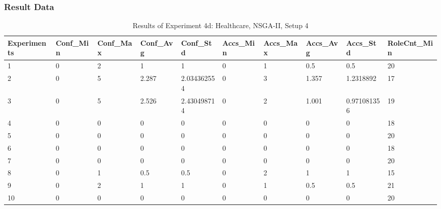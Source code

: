 		\subsubsection{Result Data}
		\label{sec:A_Exp4d_Data}
		\begin{table}[H]
			\caption{Results of Experiment 4d: Healthcare, NSGA-II, Setup 4}
			\label{tab:A_Exp4d_Data}
			\begin{adjustbox}{max width=360pt,keepaspectratio,angle=90}
				\begin{tabular}{|l|l|l|l|l|l|l|l|l|l|}
					\hline
					\rowcolor[HTML]{EFEFEF} 
					Experiments & Conf\_Min & Conf\_Max & Conf\_Avg & Conf\_Std   & Accs\_Min & Accs\_Max & Accs\_Avg & Accs\_Std   & RoleCnt\_Min \\ \hline
					1           & 0         & 2         & 1         & 1           & 0         & 1         & 0.5       & 0.5         & 20           \\ \hline
					2           & 0         & 5         & 2.287     & 2.034362554 & 0         & 3         & 1.357     & 1.2318892   & 17           \\ \hline
					3           & 0         & 5         & 2.526     & 2.430498714 & 0         & 2         & 1.001     & 0.971081356 & 19           \\ \hline
					4           & 0         & 0         & 0         & 0           & 0         & 0         & 0         & 0           & 18           \\ \hline
					5           & 0         & 0         & 0         & 0           & 0         & 0         & 0         & 0           & 20           \\ \hline
					6           & 0         & 0         & 0         & 0           & 0         & 0         & 0         & 0           & 18           \\ \hline
					7           & 0         & 0         & 0         & 0           & 0         & 0         & 0         & 0           & 20           \\ \hline
					8           & 0         & 1         & 0.5       & 0.5         & 0         & 2         & 1         & 1           & 15           \\ \hline
					9           & 0         & 2         & 1         & 1           & 0         & 1         & 0.5       & 0.5         & 21           \\ \hline
					10          & 0         & 0         & 0         & 0           & 0         & 0         & 0         & 0           & 20           \\ \hline

\end{tabular}
\end{adjustbox}
\end{table}
